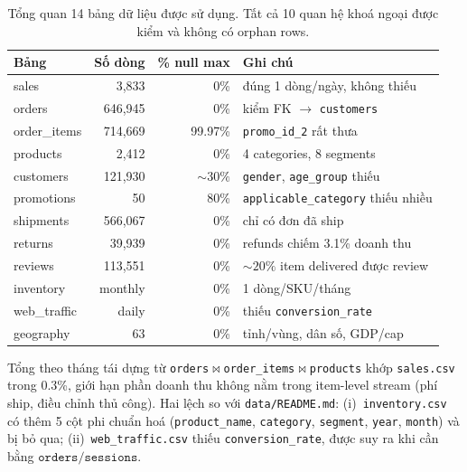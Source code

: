 \documentclass{article}
\begin{document}
\begin{table}[h]
  \caption{Tổng quan 14 bảng dữ liệu được sử dụng. Tất cả 10 quan hệ khoá ngoại được kiểm và không có orphan rows.}
  \label{tab:audit}
  \centering
  \small
  \begin{tabular}{@{}l r r l@{}}
    \toprule
    \textbf{Bảng} & \textbf{Số dòng} & \textbf{\% null max} & \textbf{Ghi chú} \\
    \midrule
    sales          & 3{,}833    & 0\%    & đúng 1 dòng/ngày, không thiếu \\
    orders         & 646{,}945  & 0\%    & kiểm FK $\to$ \texttt{customers} \\
    order\_items   & 714{,}669  & 99.97\% & \texttt{promo\_id\_2} rất thưa \\
    products       & 2{,}412    & 0\%    & 4 categories, 8 segments \\
    customers      & 121{,}930  & $\sim\!30\%$ & \texttt{gender}, \texttt{age\_group} thiếu \\
    promotions     & 50         & 80\%   & \texttt{applicable\_category} thiếu nhiều \\
    shipments      & 566{,}067  & 0\%    & chỉ có đơn đã ship \\
    returns        & 39{,}939   & 0\%    & refunds chiếm 3.1\% doanh thu \\
    reviews        & 113{,}551  & 0\%    & $\sim\!20\%$ item delivered được review \\
    inventory      & monthly    & 0\%    & 1 dòng/SKU/tháng \\
    web\_traffic   & daily      & 0\%    & thiếu \texttt{conversion\_rate} \\
    geography      & 63         & 0\%    & tỉnh/vùng, dân số, GDP/cap \\
    \bottomrule
  \end{tabular}
\end{table}

Tổng theo tháng tái dựng từ \texttt{orders}$\bowtie$\texttt{order\_items}$\bowtie$\texttt{products} khớp \texttt{sales.csv} trong 0.3\%, giới hạn phần doanh thu không nằm trong item-level stream (phí ship, điều chỉnh thủ công). Hai lệch so với \texttt{data/README.md}: (i)~\texttt{inventory.csv} có thêm 5 cột phi chuẩn hoá (\texttt{product\_name}, \texttt{category}, \texttt{segment}, \texttt{year}, \texttt{month}) và bị bỏ qua; (ii)~\texttt{web\_traffic.csv} thiếu \texttt{conversion\_rate}, được suy ra khi cần bằng $\mathtt{orders}/\mathtt{sessions}$.
\end{document}
